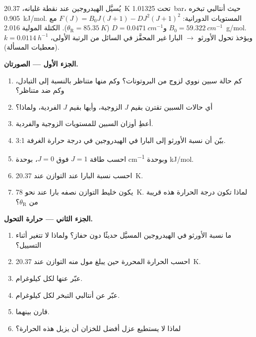 \begin{problem}
\label{pb:b3:statistical-thermo-applied:1}
يُسيَّل الهيدروجين عند نقطة غليانه، \qty{20.37}{K} تحت \qty{1.01325}{bar}، حيث
أنتالبي تبخره \qty{0.905}{kJ/mol}. المستويات الدورانية: $F(J) = B_0J(J+1) -
D J^2(J+1)^2$ مع $B_0 = \qty{59.322}{cm^{-1}}$ و$D = \qty{0.0471}{cm^{-1}}$ ($\theta_{\mathrm R} = \qty{85.35}{K}$).
الكتلة المولية \qty{2.016}{g/mol}. ويؤخذ تحول الأورثو $\to$ البارا غير المحفَّز في السائل
من الرتبة الأولى، $k = \qty{0.0114}{h^{-1}}$ (معطيات المسألة).

\medskip\noindent\textbf{الجزء الأول --- الصورتان.}
\begin{enumerate}
  \item كم حالة سبين نووي لزوج من البروتونات؟ وكم منها
        متناظر بالنسبة إلى التبادل، وكم ضد متناظر؟
  \item أي حالات السبين تقترن بقيم $J$ الزوجية، وأيها بقيم $J$ الفردية، ولماذا؟
  \item أعطِ أوزان السبين للمستويات الزوجية والفردية.
  \item بيّن أن نسبة الأورثو إلى البارا في الهيدروجين في درجة حرارة الغرفة 3:1.
  \item احسب طاقة $J = 1$ فوق $J = 0$، بوحدة \unit{cm^{-1}} وبوحدة
        \unit{kJ/mol}.
  \item احسب نسبة البارا عند التوازن عند \qty{20.37}{K}.
  \item يكون خليط التوازن نصفه بارا عند نحو \qty{78}{K}. لماذا تكون درجة الحرارة هذه
        قريبة من $\theta_{\mathrm R}$؟
\end{enumerate}

\medskip\noindent\textbf{الجزء الثاني --- حرارة التحول.}
\begin{enumerate}[resume]
  \item ما نسبة الأورثو في الهيدروجين المسيَّل حديثًا دون
        حفاز؟ ولماذا لا تتغير أثناء التسييل؟
  \item احسب الحرارة المحررة حين يبلغ مول منه التوازن عند
        \qty{20.37}{K}.
  \item عبّر عنها لكل كيلوغرام.
  \item عبّر عن أنتالبي التبخر لكل كيلوغرام.
  \item قارن بينهما.
  \item لماذا لا يستطيع عزل أفضل للخزان أن يزيل هذه الحرارة؟
\end{enumerate}


\end{problem}
